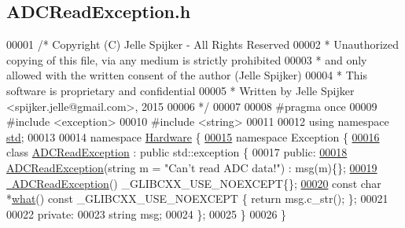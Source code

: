 \hypertarget{_a_d_c_read_exception_8h_source}{}\subsection{A\+D\+C\+Read\+Exception.\+h}
\label{_a_d_c_read_exception_8h_source}

\begin{DoxyCode}
00001 \textcolor{comment}{/* Copyright (C) Jelle Spijker - All Rights Reserved}
00002 \textcolor{comment}{ * Unauthorized copying of this file, via any medium is strictly prohibited}
00003 \textcolor{comment}{ * and only allowed with the written consent of the author (Jelle Spijker)}
00004 \textcolor{comment}{ * This software is proprietary and confidential}
00005 \textcolor{comment}{ * Written by Jelle Spijker <spijker.jelle@gmail.com>, 2015}
00006 \textcolor{comment}{ */}
00007 
00008 \textcolor{preprocessor}{#pragma once}
00009 \textcolor{preprocessor}{#include <exception>}
00010 \textcolor{preprocessor}{#include <string>}
00011 
00012 \textcolor{keyword}{using namespace }\hyperlink{namespacestd}{std};
00013 
00014 \textcolor{keyword}{namespace }\hyperlink{namespace_hardware}{Hardware} \{
\hypertarget{_a_d_c_read_exception_8h_source_l00015}{}\hyperlink{namespace_hardware_1_1_exception}{00015} \textcolor{keyword}{namespace }Exception \{
\hypertarget{_a_d_c_read_exception_8h_source_l00016}{}\hyperlink{class_hardware_1_1_exception_1_1_a_d_c_read_exception}{00016} \textcolor{keyword}{class }\hyperlink{class_hardware_1_1_exception_1_1_a_d_c_read_exception}{ADCReadException} : \textcolor{keyword}{public} std::exception \{
00017 \textcolor{keyword}{public}:
\hypertarget{_a_d_c_read_exception_8h_source_l00018}{}\hyperlink{class_hardware_1_1_exception_1_1_a_d_c_read_exception_aaa76cf7aa3fe32c27ea600c72ea4335a}{00018}   \hyperlink{class_hardware_1_1_exception_1_1_a_d_c_read_exception_aaa76cf7aa3fe32c27ea600c72ea4335a}{ADCReadException}(\textcolor{keywordtype}{string} m = \textcolor{stringliteral}{"Can't read ADC data!"}) : msg(m)\{\};
\hypertarget{_a_d_c_read_exception_8h_source_l00019}{}\hyperlink{class_hardware_1_1_exception_1_1_a_d_c_read_exception_ad59cb380b2b8eee90a87a398a3511d50}{00019}   \hyperlink{class_hardware_1_1_exception_1_1_a_d_c_read_exception_ad59cb380b2b8eee90a87a398a3511d50}{~ADCReadException}() \_GLIBCXX\_USE\_NOEXCEPT\{\};
\hypertarget{_a_d_c_read_exception_8h_source_l00020}{}\hyperlink{class_hardware_1_1_exception_1_1_a_d_c_read_exception_aa2c8ee0d183837450a0dea15901e3dc4}{00020}   \textcolor{keyword}{const} \textcolor{keywordtype}{char} *\hyperlink{class_hardware_1_1_exception_1_1_a_d_c_read_exception_aa2c8ee0d183837450a0dea15901e3dc4}{what}() const \_GLIBCXX\_USE\_NOEXCEPT \{ \textcolor{keywordflow}{return} msg.c\_str(); \};
00021 
00022 \textcolor{keyword}{private}:
00023   \textcolor{keywordtype}{string} msg;
00024 \};
00025 \}
00026 \}
\end{DoxyCode}
